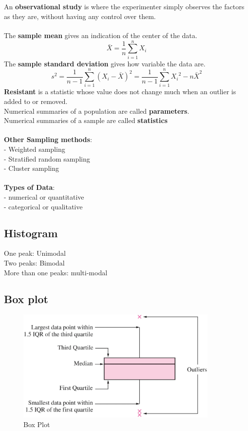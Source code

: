 \documentclass[../main.tex]{subfiles}
\begin{document}
\\\\
An \textbf{observational study} is where the experimenter simply observes the factors as they are, without having any control over them.
\\\\
The \textbf{sample mean} gives an indication of the center of the data.
\begin{equation*}
    \bar{X} = \frac{1}{n}\sum_{i=1}^{n}X_i
\end{equation*}
The \textbf{sample standard deviation} gives how variable the data are.
\begin{equation*}
    s^2 = \frac{1}{n-1}\sum_{i=1}^{n}{(X_i-\bar{X})^2}=\frac{1}{n-1}{\sum_{i=1}^{n}{{X_i}^2-n\bar{X}^2}}
\end{equation*}
\textbf{Resistant} is a statistic whose value does not change much when an outlier is added to or removed.
\\
Numerical summaries of a population are called \textbf{parameters}.
\\
Numerical summaries of a sample are called \textbf{statistics}
\\\\
\textbf{Other Sampling methods}:\\
- Weighted sampling\\
- Stratified random sampling\\
- Cluster sampling
\\\\
\textbf{Types of Data}:\\
- numerical or quantitative\\
- categorical or qualitative
\subsection{Histogram}
One peak: Unimodal\\
Two peaks: Bimodal\\
More than one peaks: multi-modal
\subsection{Box plot}
\begin{figure}[bh]
\centering
\includegraphics[width=10cm]{Sections/Image/BoxPlot.png}

\caption{Box Plot}
\end{figure}
\end{document}
